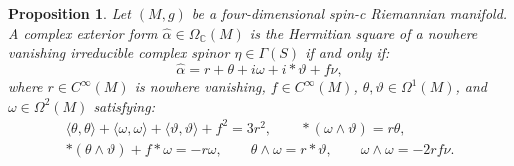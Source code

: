 \documentclass[10pt,a4paper,twoside,reqno]{amsart}
\theoremstyle{plain}
\newtheorem{prop}[thm]{Proposition}
\theoremstyle{definition}
\theoremstyle{remark}
\def\C{\mathbb{C}}
\newcommand{\escal}[1]{\langle#1\rangle}
\begin{document}
\begin{prop}\label{prop:square_(4,0)}
    Let $(M,g)$ be a four-dimensional spin-c Riemannian manifold. A complex exterior form $\widehat{\alpha}\in\Omega_\C(M)$ is the Hermitian square of a nowhere vanishing irreducible complex spinor $\eta\in\Gamma(S)$ if and only if: $$\widehat{\alpha}=r+\theta+i\omega+i*\vartheta+f\nu,$$ where $r\in C^\infty(M)$ is nowhere vanishing, $f\in C^\infty(M)$, $\theta,\vartheta\in\Omega^1(M)$, and $\omega\in\Omega^2(M)$ satisfying: \begin{gather*}
        \escal{\theta,\theta}+\escal{\omega,\omega}+\escal{\vartheta,\vartheta}+f^2=3r^2,\qquad *(\omega\wedge\vartheta)=r\theta,\\
        *(\theta\wedge\vartheta)+f*\omega=-r\omega,\qquad \theta\wedge\omega=r*\vartheta,\qquad \omega\wedge\omega=-2rf\nu.
    \end{gather*}
\end{prop}
\end{document}

